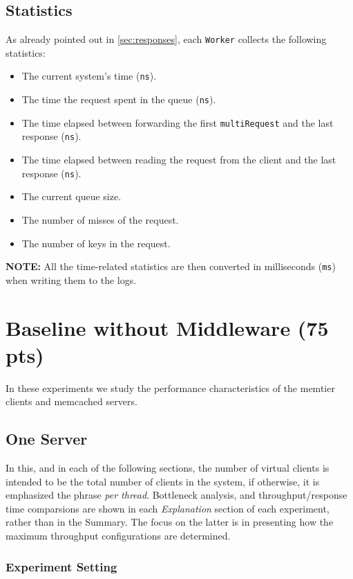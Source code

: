 \documentclass[11pt,a4paper]{article}
\begin{document}
\subsection{Statistics}
\label{sec:1.10}

As already pointed out in \ref{sec:responses}, each \texttt{Worker} collects the following statistics:

\begin{itemize}
    \item The current system's time (\texttt{ns}).
    \item The time the request spent in the queue (\texttt{ns}).
    \item The time elapsed between forwarding the first \texttt{multiRequest} and the last response (\texttt{ns}).
    \item The time elapsed between reading the request from the client and the last response (\texttt{ns}).
    \item The current queue size.
    \item The number of misses of the request.
    \item The number of keys in the request.
\end{itemize}

\textbf{NOTE:} All the time-related statistics are then converted in milliseconds (\texttt{ms}) when writing them to the logs.

\section{Baseline without Middleware (75 pts)}

In these experiments we study the performance characteristics of the memtier clients and memcached servers.

\subsection{One Server}
\label{sec:2.1}

In this, and in each of the following sections, the number of virtual clients is intended to be the total number of clients in the system, if otherwise, it is emphasized the phrase \textit{per thread}.
Bottleneck analysis, and throughput/response time comparsions are shown in each \textit{Explanation} section of each experiment, rather than in the Summary.
The focus on the latter is in presenting how the maximum throughput configurations are determined.

\subsubsection{Experiment Setting}
\end{document}
